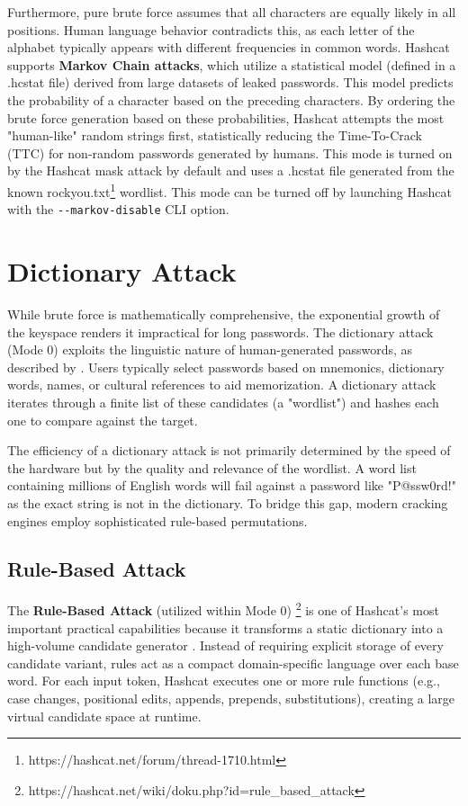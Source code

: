 Furthermore, pure brute force assumes that all characters are equally likely in all positions. Human language behavior contradicts this, as each letter of the alphabet typically appears with different frequencies in common words. Hashcat supports \textbf{Markov Chain attacks}, which utilize a statistical model (defined in a .hcstat file) derived from large datasets of leaked passwords. This model predicts the probability of a character based on the preceding characters. By ordering the brute force generation based on these probabilities, Hashcat attempts the most "human-like" random strings first, statistically reducing the Time-To-Crack (TTC) for non-random passwords generated by humans. This mode is turned on by the Hashcat mask attack by default and uses a .hcstat file generated from the known rockyou.txt\footnote{https://hashcat.net/forum/thread-1710.html} wordlist. This mode can be turned off by launching Hashcat with the \verb|--markov-disable| CLI option.



\section{Dictionary Attack}

While brute force is mathematically comprehensive, the exponential growth of the keyspace renders it impractical for long passwords. The dictionary attack (Mode 0) exploits the linguistic nature of human-generated passwords, as described by \cite{enwiki:1320882747}. Users typically select passwords based on mnemonics, dictionary words, names, or cultural references to aid memorization. A dictionary attack iterates through a finite list of these candidates (a "wordlist") and hashes each one to compare against the target.

The efficiency of a dictionary attack is not primarily determined by the speed of the hardware but by the quality and relevance of the wordlist. A word list containing millions of English words will fail against a password like "P@ssw0rd!" as the exact string is not in the dictionary. To bridge this gap, modern cracking engines employ sophisticated rule-based permutations.


\subsection{Rule-Based Attack}

The \textbf{Rule-Based Attack} (utilized within Mode 0) \footnote{https://hashcat.net/wiki/doku.php?id=rule\_based\_attack} is one of Hashcat's most important practical capabilities because it transforms a static dictionary into a high-volume candidate generator \cite{hashcat_wiki}. Instead of requiring explicit storage of every candidate variant, rules act as a compact domain-specific language over each base word. For each input token, Hashcat executes one or more rule functions (e.g., case changes, positional edits, appends, prepends, substitutions), creating a large virtual candidate space at runtime.

